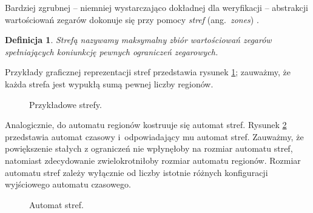 \documentclass{pracamgr}
\newcommand{\ang}[1]{(ang.~\emph{#1})}
\theoremstyle{plain}
\newtheorem{definition}{Definicja}
\begin{document}
Bardziej zgrubnej -- niemniej wystarczająco dokładnej dla
weryfikacji -- abstrakcji wartościowań zegarów dokonuje się przy pomocy
\emph{stref} \ang{zones} \cite{henz-94}.
\begin{definition}
  Strefą nazywamy maksymalny zbiór wartościowań zegarów spełniających
  koniunkcję pewnych ograniczeń zegarowych.
\end{definition}
Przykłady graficznej reprezentacji stref przedstawia rysunek
\ref{img:zones}; zauważmy, że każda strefa jest wypukłą sumą pewnej
liczby regionów.
\begin{figure}
  \centering
  \hspace{1.5cm}
  \caption{Przykładowe strefy.}
  \label{img:zones}
\end{figure}

Analogicznie, do automatu regionów kostruuje się automat stref.
Rysunek \ref{img:zones-automaton} przedstawia automat czasowy
i~odpowiadający mu automat stref. Zauważmy, że powiększenie stałych z
ograniczeń nie wpłynęłoby na rozmiar automatu stref, natomiast
zdecydowanie zwielokrotniłoby rozmiar automatu regionów. Rozmiar
automatu stref zależy wyłącznie od liczby istotnie różnych
konfiguracji wyjściowego automatu czasowego.
\begin{figure}
  \centering
   \hspace{1cm}
  \caption{Automat stref.}
  \label{img:zones-automaton}
\end{figure}
\end{document}
